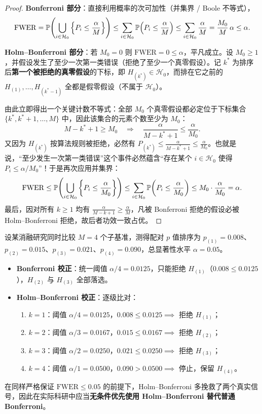 \begin{proof}
\textbf{Bonferroni 部分}：直接利用概率的次可加性（并集界 / Boole 不等式），
\[
  \mathrm{FWER}
  = \mathbb{P}\!\left(\bigcup_{i\in\mathcal{H}_0} \left\{P_i \le \frac{\alpha}{M}\right\}\right)
  \le \sum_{i\in\mathcal{H}_0} \mathbb{P}\!\left(P_i \le \frac{\alpha}{M}\right)
  \le \sum_{i\in\mathcal{H}_0} \frac{\alpha}{M}
  = \frac{M_0}{M}\,\alpha \le \alpha.
\]

\textbf{Holm--Bonferroni 部分}：若 $M_0 = 0$ 则 $\mathrm{FWER} = 0 \le \alpha$，平凡成立。设 $M_0 \ge 1$，并假设发生了至少一次第一类错误（拒绝了至少一个真零假设）。记 $k^*$ 为排序后\textbf{第一个被拒绝的真零假设}的下标，即 $H_{(k^*)} \in \mathcal{H}_0$，而排在它之前的 $H_{(1)},\dots,H_{(k^*-1)}$ 全都是假零假设（不属于 $\mathcal{H}_0$）。

由此立即得出一个关键计数不等式：全部 $M_0$ 个真零假设都必定位于下标集合 $\{k^*, k^*+1, \dots, M\}$ 中，因此该集合的元素个数至少为 $M_0$：
\[
  M - k^* + 1 \ge M_0 \quad\Longrightarrow\quad \frac{\alpha}{M - k^* + 1} \le \frac{\alpha}{M_0}.
\]
又因为 $H_{(k^*)}$ 按算法规则被拒绝，必然有 $P_{(k^*)} \le \frac{\alpha}{M - k^* + 1} \le \frac{\alpha}{M_0}$。也就是说，“至少发生一次第一类错误”这个事件必然蕴含“存在某个 $i \in \mathcal{H}_0$ 使得 $P_i \le \alpha / M_0$”！于是再次应用并集界：
\[
  \mathrm{FWER}
  \le \mathbb{P}\!\left(\bigcup_{i\in\mathcal{H}_0} \left\{P_i \le \frac{\alpha}{M_0}\right\}\right)
  \le \sum_{i\in\mathcal{H}_0} \mathbb{P}\!\left(P_i \le \frac{\alpha}{M_0}\right)
  \le M_0 \cdot \frac{\alpha}{M_0} = \alpha.
\]
最后，因对所有 $k \ge 1$ 均有 $\frac{\alpha}{M-k+1} \ge \frac{\alpha}{M}$，凡被 Bonferroni 拒绝的假设必被 Holm--Bonferroni 拒绝，故后者功效一致占优。
\end{proof}

\begin{example}\label{ex:holm}
设某消融研究同时比较 $M=4$ 个子基准，测得配对 $p$ 值排序为 $p_{(1)} = 0.008$、$p_{(2)} = 0.015$、$p_{(3)} = 0.021$、$p_{(4)} = 0.090$，总显著性水平 $\alpha = 0.05$。
\begin{itemize}
  \item \textbf{Bonferroni 校正}：统一阈值 $\alpha/4 = 0.0125$，只能拒绝 $H_{(1)}$（$0.008 \le 0.0125$），$H_{(2)}$ 与 $H_{(3)}$ 全部落选。
  \item \textbf{Holm--Bonferroni 校正}：逐级比对：
  \begin{enumerate}
    \item $k=1$：阈值 $\alpha/4 = 0.0125$，$0.008 \le 0.0125 \implies$ 拒绝 $H_{(1)}$；
    \item $k=2$：阈值 $\alpha/3 = 0.0167$，$0.015 \le 0.0167 \implies$ 拒绝 $H_{(2)}$；
    \item $k=3$：阈值 $\alpha/2 = 0.0250$，$0.021 \le 0.0250 \implies$ 拒绝 $H_{(3)}$；
    \item $k=4$：阈值 $\alpha/1 = 0.0500$，$0.090 > 0.0500 \implies$ 停止，保留 $H_{(4)}$。
  \end{enumerate}
\end{itemize}
在同样严格保证 $\mathrm{FWER} \le 0.05$ 的前提下，Holm--Bonferroni 多挽救了两个真实信号，因此在实际科研中应当\textbf{无条件优先使用 Holm--Bonferroni 替代普通 Bonferroni}。
\end{example}

